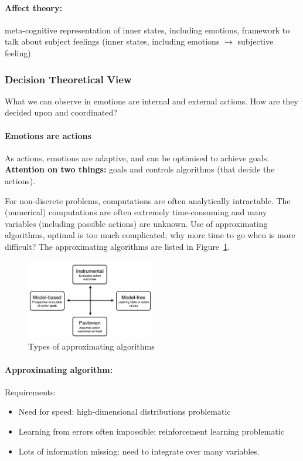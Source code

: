 \documentclass[12pt,article,oneside,a4paper]{memoir}
\begin{document}
\paragraph{Affect theory:} meta-cognitive representation of inner states,
including emotions, framework to talk about subject feelings (inner states,
including emotions $\rightarrow$ subjective feeling)

\subsubsection{Decision Theoretical View}
What we can observe in emotions are internal and external actions. How are they
decided upon and coordinated?

\paragraph{Emotions are actions}
As actions, emotions are adaptive, and can be optimised to achieve goals.
\textbf{Attention on two things:} goals and controls algorithms (that decide
the actions).

For non-discrete problems, computations are often analytically intractable. The
(numerical) computations are often extremely time-consuming and many variables
(including possible actions) are unknown. Use of approximating algorithms,
optimal is too much complicated; why more time to go when is more difficult?
The approximating algorithms are listed in
Figure~\ref{fig:approximating-algorithms}.

\begin{figure}
  \centering
  \includegraphics[width=0.5\textwidth]{imgs/approximating-algorithms.png}
  \caption{Types of approximating algorithms}
  \label{fig:approximating-algorithms}
\end{figure}

\paragraph{Approximating algorithm:} 
Requirements: 
\begin{itemize}
\item Need for speed: high-dimensional distributions problematic
\item Learning from errors often impossible: reinforcement learning problematic
\item Lots of information missing: need to integrate over many variables.
\end{itemize}
\end{document}
